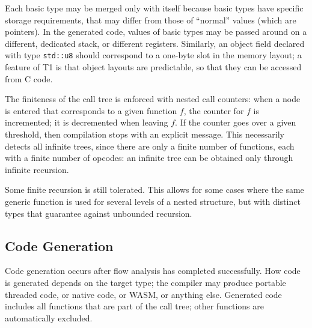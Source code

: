 \begin{rationale}
Each basic type may be merged only with itself because basic types have
specific storage requirements, that may differ from those of ``normal''
values (which are pointers). In the generated code, values of basic
types may be passed around on a different, dedicated stack, or different
registers. Similarly, an object field declared with type \verb|std::u8|
should correspond to a one-byte slot in the memory layout; a feature
of T1 is that object layouts are predictable, so that they can be
accessed from C code.

The finiteness of the call tree is enforced with nested call counters:
when a node is entered that corresponds to a given function $f$, the
counter for $f$ is incremented; it is decremented when leaving $f$. If
the counter goes over a given threshold, then compilation stops with an
explicit message. This necessarily detects all infinite trees, since
there are only a finite number of functions, each with a finite number
of opcodes: an infinite tree can be obtained only through infinite
recursion.

Some finite recursion is still tolerated. This allows for some cases
where the same generic function is used for several levels of a nested
structure, but with distinct types that guarantee against unbounded
recursion.
\end{rationale}

\subsection{Code Generation}

Code generation occurs after flow analysis has completed successfully.
How code is generated depends on the target type; the compiler may
produce portable threaded code, or native code, or WASM, or anything
else. Generated code includes all functions that are part of the
call tree; other functions are automatically excluded.

